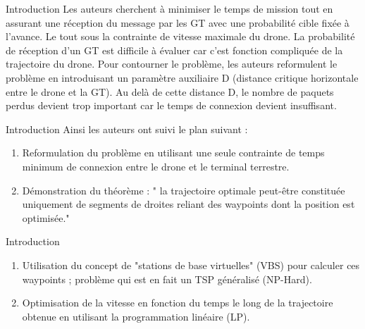 \begin{frame}{Introduction}
Les auteurs cherchent à minimiser le temps de mission tout en assurant une réception du message par les GT avec une probabilité cible fixée à l'avance. Le tout sous la contrainte de vitesse maximale du drone. La probabilité de réception d'un GT est difficile à évaluer car c'est fonction compliquée de la trajectoire du drone. Pour contourner le problème, les auteurs reformulent le problème en introduisant un paramètre auxiliaire D (distance critique horizontale entre le drone et la GT). Au delà de cette distance D, le nombre de paquets perdus devient trop important car le temps de connexion devient insuffisant. 


\end{frame}


\newcommand{\asuivre}{\setcounter{sauvegardeenumi}{\theenumi}}
\newcommand{\suite}{\setcounter{enumi}{\thesauvegardeenumi}}

\begin{frame}{Introduction}
	Ainsi les auteurs ont suivi le plan suivant : 
\begin{enumerate}
	
	\item Reformulation du problème en utilisant une seule contrainte
	de temps minimum de connexion entre le drone et le terminal terrestre.	
	\item Démonstration du théorème : " la trajectoire optimale
	peut-être constituée uniquement de segments de droites reliant des
	waypoints dont la position est optimisée."

	
\end{enumerate}
\asuivre
\end{frame}



\begin{frame}{Introduction}
 
\begin{enumerate}
	\suite
	\item Utilisation du concept de "stations de base virtuelles" (VBS) pour calculer ces waypoints ;  problème qui est en fait un TSP généralisé (NP-Hard).

	\item Optimisation de la vitesse en fonction du temps le long de la trajectoire obtenue
	en utilisant la programmation linéaire (LP).

\end{enumerate}

\end{frame}



